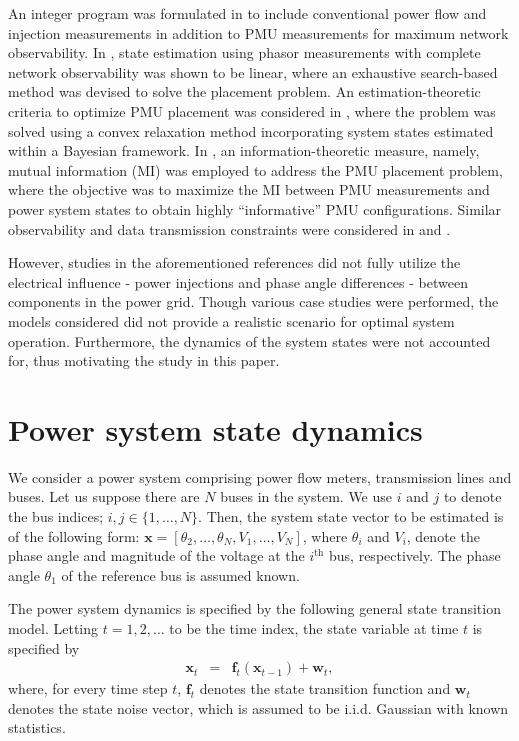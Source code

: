\documentclass[10pt,journal,twocolumn]{IEEEtran}\IEEEoverridecommandlockouts
\newcommand{\iid}{i.i.d.}
\begin{document}
An integer program was formulated in \cite{Xu2004} to include conventional power flow and injection measurements in addition to PMU measurements for maximum network observability. In \cite{Azizi2012}, state estimation using phasor measurements with complete network observability was shown to be linear, where an exhaustive search-based method was devised to solve the placement problem. An estimation-theoretic criteria to optimize PMU placement was considered in \cite{Kekatos2012}, where the problem was solved using a convex relaxation method incorporating system states estimated within a Bayesian framework. In \cite{Li2013}, an information-theoretic measure, namely, mutual information (MI) was employed to address the PMU placement problem, where the objective was to maximize the MI between PMU measurements and power system states to obtain highly ``informative'' PMU configurations. Similar observability and data transmission constraints were considered in \cite{Fesharaki2013} and \cite{Anderson2014}.

However, studies in the aforementioned references did not fully utilize the electrical influence - power injections and phase angle differences - between components in the power grid. Though various case studies were performed, the models considered did not provide a realistic scenario for optimal system operation. Furthermore, the dynamics of the system states were not accounted for, thus motivating the study in this paper.

\section{Power system state dynamics}\label{sec:state_dynamics}
We consider a power system comprising power flow meters, transmission lines and buses. Let us suppose there are $N$ buses in the system. We use $i$ and $j$ to denote the bus indices; $i, j\in \{1,\dots,N\}$. Then, the system state vector to be estimated is of the following form: $\boldsymbol{x} = [\theta_2,\dots,\theta_{N}, V_1,\dots,V_{N}]$, where $\theta_{i}$ and $V_{i}$, denote the phase angle and  magnitude of the voltage at the $i^{\text{th}}$ bus, respectively. The phase angle $\theta_1$ of the reference bus is assumed known.

The power system dynamics is specified by the following general state transition model. Letting $t=1,2,\dots$ to be the time index, the state variable at time $t$ is specified by
\begin{eqnarray}
\boldsymbol{x}_{t} &=& \boldsymbol{f}_{t}(\boldsymbol{x}_{t-1}) + \boldsymbol{w}_{t},\label{eq:state_var}
\end{eqnarray}
where, for every time step $t$, $\boldsymbol{f}_{t}$ denotes the state transition function and $\boldsymbol{w}_{t}$ denotes the state noise vector, which is assumed to be {\iid} Gaussian with known statistics.
\end{document}
